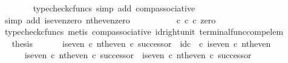 \begin{isabellebody}
\ \ \ \ \ \ \isamarkupfalse%
\ {\isacharparenleft}{\kern0pt}typecheck{\isacharunderscore}{\kern0pt}cfuncs{\isacharcomma}{\kern0pt}\ simp\ add{\isacharcolon}{\kern0pt}\ comp{\isacharunderscore}{\kern0pt}associative{}{\isacharparenright}{\kern0pt}\isanewline
\ \ \ \ \isamarkupfalse%
\ \isamarkupfalse%
\ {\isachardoublequoteopen}{\isachardot}{\kern0pt}{\isachardot}{\kern0pt}{\isachardot}{\kern0pt}\ {\isacharequal}{\kern0pt}\ {\isasymt}{\isachardoublequoteclose}\isanewline
\ \ \ \ \ \ \isamarkupfalse%
\ {\isacharparenleft}{\kern0pt}simp\ add{\isacharcolon}{\kern0pt}\ is{\isacharunderscore}{\kern0pt}even{\isacharunderscore}{\kern0pt}zero\ nth{\isacharunderscore}{\kern0pt}even{\isacharunderscore}{\kern0pt}zero{\isacharparenright}{\kern0pt}\isanewline
\ \ \ \ \isamarkupfalse%
\ \isamarkupfalse%
\ {\isachardoublequoteopen}{\isachardot}{\kern0pt}{\isachardot}{\kern0pt}{\isachardot}{\kern0pt}\ {\isacharequal}{\kern0pt}\ {\isacharparenleft}{\kern0pt}{\isasymt}\ {\isasymcirc}\isactrlsub c\ {\isasymbeta}\isactrlbsub {\isasymnat}\isactrlsub c\isactrlesub {\isacharparenright}{\kern0pt}\ {\isasymcirc}\isactrlsub c\ zero{\isachardoublequoteclose}\isanewline
\ \ \ \ \ \ \isamarkupfalse%
\ {\isacharparenleft}{\kern0pt}typecheck{\isacharunderscore}{\kern0pt}cfuncs{\isacharcomma}{\kern0pt}\ metis\ comp{\isacharunderscore}{\kern0pt}associative{}\ id{\isacharunderscore}{\kern0pt}right{\isacharunderscore}{\kern0pt}unit{}\ terminal{\isacharunderscore}{\kern0pt}func{\isacharunderscore}{\kern0pt}comp{\isacharunderscore}{\kern0pt}elem{\isacharparenright}{\kern0pt}\isanewline
\ \ \ \ \isamarkupfalse%
\ \isamarkupfalse%
\ {\isacharquery}{\kern0pt}thesis\isacommand{{\isachardot}{\kern0pt}}\isamarkupfalse%
\isanewline
\ \ \isamarkupfalse%
\isanewline
\isanewline
\ \ \isamarkupfalse%
\ {\isachardoublequoteopen}{\isacharparenleft}{\kern0pt}is{\isacharunderscore}{\kern0pt}even\ {\isasymcirc}\isactrlsub c\ nth{\isacharunderscore}{\kern0pt}even{\isacharparenright}{\kern0pt}\ {\isasymcirc}\isactrlsub c\ successor\ {\isacharequal}{\kern0pt}\ id\isactrlsub c\ {\isasymOmega}\ {\isasymcirc}\isactrlsub c\ is{\isacharunderscore}{\kern0pt}even\ {\isasymcirc}\isactrlsub c\ nth{\isacharunderscore}{\kern0pt}even{\isachardoublequoteclose}\isanewline
\ \ \isamarkupfalse%
\ {\isacharminus}{\kern0pt}\isanewline
\ \ \ \ \isamarkupfalse%
\ {\isachardoublequoteopen}{\isacharparenleft}{\kern0pt}is{\isacharunderscore}{\kern0pt}even\ {\isasymcirc}\isactrlsub c\ nth{\isacharunderscore}{\kern0pt}even{\isacharparenright}{\kern0pt}\ {\isasymcirc}\isactrlsub c\ successor\ {\isacharequal}{\kern0pt}\ is{\isacharunderscore}{\kern0pt}even\ {\isasymcirc}\isactrlsub c\ nth{\isacharunderscore}{\kern0pt}even\ {\isasymcirc}\isactrlsub c\ successor{\isachardoublequoteclose}\isanewline

\end{isabellebody}
